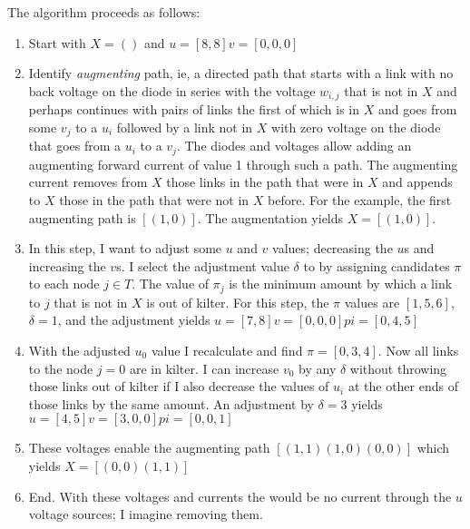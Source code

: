 \documentclass[12pt]{article}
\begin{document}
The algorithm proceeds as follows:
\begin{enumerate}
\item Start with $X=()$ and $u= [ 8,  8] v= [ 0,  0,  0] $
\item Identify \emph{augmenting} path, ie, a directed path that starts
  with a link with no back voltage on the diode in series with the
  voltage $w_{i,j}$ that is not in $X$ and perhaps continues with
  pairs of links the first of which is in $X$ and goes from some $v_j$
  to a $u_i$ followed by a link not in $X$ with zero voltage on the
  diode that goes from a $u_i$ to a $v_j$.  The diodes and voltages
  allow adding an augmenting forward current of value 1 through such a
  path.  The augmenting current removes from $X$ those links in the
  path that were in $X$ and appends to $X$ those in the path that were
  not in $X$ before.  For the example, the first augmenting path is
  $[(1,0)]$.  The augmentation yields $X=[(1,0)]$.
\item In this step, I want to adjust some $u$ and $v$ values;
  decreasing the $u$s and increasing the $v$s.  I select the
  adjustment value $\delta$ to by assigning candidates $\pi$ to each
  node $j\in T$.  The value of $\pi_j$ is the minimum amount by which a
  link to $j$ that is not in $X$ is out of kilter.  For this step, the
  $\pi$ values are $[ 1, 5, 6]$, $\delta=1$, and the adjustment yields
  $u= [ 7, 8] v= [ 0, 0, 0] pi= [ 0, 4, 5]$
\item With the adjusted $u_0$ value I recalculate and find
  $\pi=[0,3,4]$.  Now all links to the node $j=0$ are in kilter.  I
  can increase $v_0$ by any $\delta$ without throwing those links out
  of kilter if I also decrease the values of $u_i$ at the other ends
  of those links by the same amount.  An adjustment by $\delta=3$
  yields $u= [ 4, 5] v= [ 3, 0, 0] pi= [ 0, 0, 1]$
\item These voltages enable the augmenting path $[(1,1) (1,0) (0,0)]$
  which yields $X= [(0, 0) (1, 1)]$
\item End.  With these voltages and currents the would be no current
  through the $u$ voltage sources; I imagine removing them.
\end{enumerate}
\end{document}
